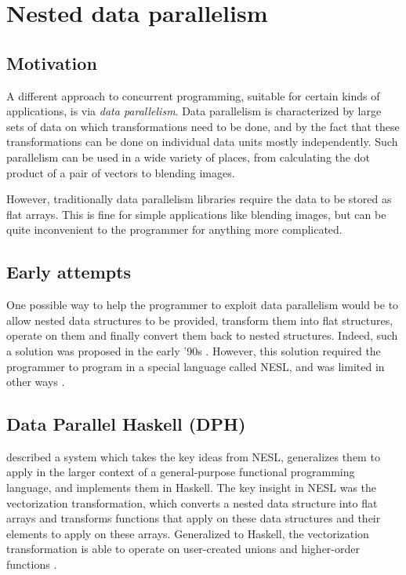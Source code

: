 \documentclass[a4paper]{acmtrans2m}
\begin{document}
\section{Nested data parallelism}
\label{sec:dph}

\subsection{Motivation}
A different approach to concurrent programming, suitable for certain kinds of
applications, is via \textit{data parallelism}. Data parallelism is
characterized by large sets of data on which transformations need to be done,
and by the fact that these transformations can be done on individual data
units mostly independently. Such parallelism can be used in a wide variety of
places, from calculating the dot product of a pair of vectors to blending
images.

However, traditionally data parallelism libraries require the data to be stored
as flat arrays. This is fine for simple applications like blending images, but
can be quite inconvenient to the programmer for anything more complicated.

\subsection{Early attempts}
One possible way to help the programmer to exploit data parallelism would be to
allow nested data structures to be provided, transform them into flat structures,
operate on them and finally convert them back to nested structures. Indeed, such a solution was proposed in the early '90s \cite{Blelloch:1993,Blelloch:1996}.
However, this solution required the programmer to program in a special
language called NESL, and was limited in other ways \cite{Chakravarty:2007}.

\subsection{Data Parallel Haskell (DPH)}

 described a system which takes the key ideas from NESL,
generalizes them to apply in the larger context of a general-purpose functional
programming language, and implements them in Haskell. The key insight in NESL was
the vectorization transformation, which converts a nested data structure into flat
arrays and transforms functions that apply on these data structures and their
elements to apply on these arrays. Generalized to Haskell,
the vectorization transformation is able to operate on user-created unions and
higher-order functions \cite{SPJ:2008}.
\end{document}
